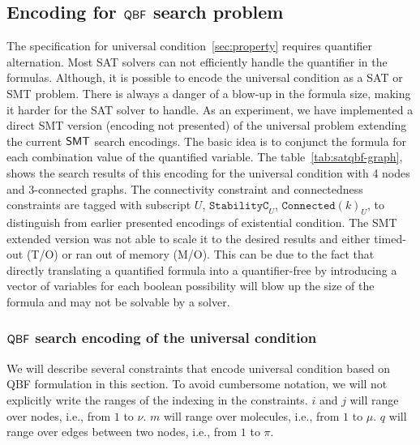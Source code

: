 \subsection{Encoding for $\mathsf{QBF}$ search problem}\label{enc:univ-cond}
%

\noindent The specification for universal condition~\ref{sec:property} requires quantifier alternation. 
%
Most SAT solvers can not efficiently handle the quantifier in the formulas. 
% 
Although, it is possible to encode the universal condition as a SAT or SMT problem.
%
There is always a danger of a blow-up in the formula size, making it harder for the SAT solver to handle. 
% 
As an experiment, we have implemented a direct SMT version (encoding not presented) of the universal problem extending the current $\mathsf{SMT}$ search encodings.
%
The basic idea is to conjunct the formula for each combination value of the quantified variable. 
%
The table~\ref{tab:satqbf-graph}, shows the search results of this encoding for the universal condition with 4 nodes and 3-connected graphs. 
%
The connectivity constraint and connectedness constraints are tagged with subscript $U$, $\texttt{StabilityC}_{U}$, $\texttt{Connected}(k)_{U}$,  to distinguish from earlier presented encodings of existential condition.
%
The SMT extended version was not able to scale it to the desired results and either timed-out (T/O) or ran out of memory (M/O).
%
This can be due to the fact that directly translating a quantified formula into a quantifier-free  by introducing a vector of variables for each boolean possibility will blow up the size of the formula and may not be solvable by a solver.
%
%
\subsubsection{$\mathsf{QBF}$ search encoding of the universal condition}
We will describe several constraints that encode universal condition based on QBF formulation in this section.
%
To avoid cumbersome notation, we will not explicitly write the ranges
of the indexing in the constraints.
%
$i$ and $j$ will range over nodes, i.e., from $1$ to $\nu$.
%
$m$ will range over molecules, i.e., from $1$ to $\mu$.
%
$q$ will range over edges between two nodes, i.e., from $1$ to $\pi$.
%

